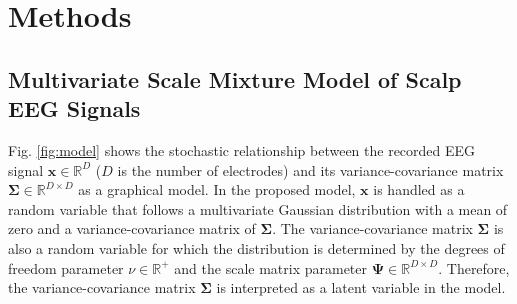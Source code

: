 \documentclass[journal]{IEEEtran}
\begin{document}
\section{Methods}

\subsection{Multivariate Scale Mixture Model of Scalp EEG Signals}
Fig. \ref{fig:model} shows the stochastic relationship between the recorded EEG signal $\mathbf{x} \in \mathbb{R}^{D}$ ($D$ is the number of electrodes) and its variance-covariance matrix $\mathbf{\Sigma} \in \mathbb{R}^{D \times D}$ as a graphical model.
In the proposed model, $\mathbf{x}$ is handled as a random variable that follows a multivariate Gaussian distribution with a mean of zero and a variance-covariance matrix of $\mathbf{\Sigma}$.
The variance-covariance matrix $\mathbf{\Sigma}$ is also a random variable for which the distribution is determined by the degrees of freedom parameter $\nu \in \mathbb{R}^+$ and the scale matrix parameter $\mathbf{\Psi} \in \mathbb{R}^{D \times D}$.
Therefore, the variance-covariance matrix $\mathbf{\Sigma}$ is interpreted as a latent variable in the model.
\end{document}
